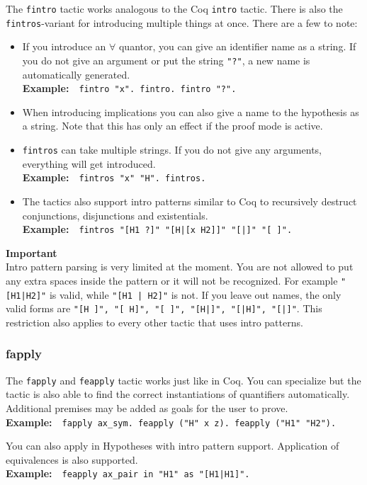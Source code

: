 \documentclass[12pt, a4paper]{article}
\newcommand{\coq}[1]{\texttt{#1}}
\newcommand{\important}[1]{
	\vspace{3pt}
	\begin{boximportant}
		\textcolor{colorimportant}{\textbf{Important}\\#1}
	\end{boximportant}}
\newcommand{\example}[1]{\medskip\\\textbf{Example:}~~#1}
\begin{document}
The \texttt{fintro} tactic works analogous to the Coq \texttt{intro} tactic. 
There is also the \texttt{fintros}-variant for introducing multiple things at once. 
There are a few  to note:
\begin{itemize}
	\item 
	If you introduce an $\forall$ quantor, you can give an identifier name as a string. 
	If you do not give an argument or put the string \coq{"?"}, a new name is automatically generated.
	\example{\coq{fintro "x". fintro. fintro "?".}}
	
	\item
	When introducing implications you can also give a name to the hypothesis as a string. 
	Note that this has only an effect if the proof mode is active.
	
	\item 
	\texttt{fintros} can take multiple strings. 
	If you do not give any arguments, everything will get introduced.
	\example{\coq{fintros "x" "H". fintros.}}
	
	\item
	The tactics also support intro patterns similar to Coq to recursively destruct conjunctions, disjunctions and existentials.
	\example{\coq{fintros "[H1 ?]" "[H|[x H2]]" "[|]" "[ ]".}}
\end{itemize}
\important{Intro pattern parsing is very limited at the moment. You are not allowed to put any extra spaces inside the pattern or it will not be recognized. For example \texttt{"[H1|H2]"} is valid, while \texttt{"[H1 | H2]"} is not. If you leave out names, the only valid forms are \texttt{"[H ]", "[ H]", "[ ]", "[H|]", "[|H]", "[|]"}. This restriction also applies to every other tactic that uses intro patterns.}



\subsubsection{\ttfamily fapply}

The \texttt{fapply} and \texttt{feapply} tactic works just like in Coq. 
You can specialize but the tactic is also able to find the correct instantiations of quantifiers automatically. Additional premises may be added as goals for the user to prove.
\example{\coq{fapply ax_sym. feapply ("H" x z). feapply ("H1" "H2").}}

\medskip\noindent
You can also apply in Hypotheses with intro pattern support. Application of equivalences is also supported.
\example{\coq{feapply ax_pair in "H1" as "[H1|H1]".}}
\end{document}

